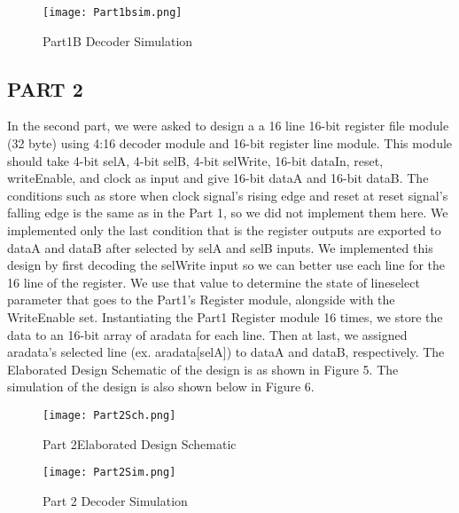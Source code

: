 \documentclass[pdftex,12pt,a4paper]{article}
\begin{document}
\begin{figure}[ht]
	\centering
	\texttt{[image: Part1bsim.png]}
	\caption{Part1B Decoder Simulation}
	\label{fig1}
\end{figure}

\newpage
\subsection{PART 2}
In the second part, we were asked to design a a 16 line 16-bit register file module (32 byte) using 4:16 decoder module and 16-bit register line module. This module should take 4-bit selA, 4-bit selB, 4-bit selWrite, 16-bit dataIn, reset, writeEnable, and clock as input and give 16-bit dataA and 16-bit dataB. The conditions such as store when clock signal's rising edge and reset at reset signal's falling edge is the same as in the Part 1, so we did not implement them here. We implemented only the last condition that is the register outputs are exported to dataA and dataB after selected by selA and selB inputs. We implemented this design by first decoding the selWrite input so we can better use each line for the 16 line of the register. We use that value to determine the state of lineselect parameter that goes to the Part1's Register module, alongside with the WriteEnable set. Instantiating the Part1 Register module 16 times, we store the data to an 16-bit array of aradata for each line. Then at last, we assigned aradata's selected line (ex. aradata[selA]) to dataA and dataB, respectively. The Elaborated Design Schematic of the design is as shown in Figure 5. The simulation of the design is also shown below in Figure 6. 

\begin{figure}[ht]
	\centering
	\texttt{[image: Part2Sch.png]}
	\caption{Part 2Elaborated Design Schematic}
	\label{fig1}
\end{figure}

\begin{figure}[ht]
	\centering
	\texttt{[image: Part2Sim.png]}
	\caption{Part 2 Decoder Simulation}
	\label{fig1}
\end{figure}

\newpage
\end{document}
